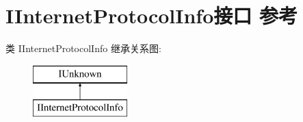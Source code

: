 \hypertarget{interface_i_internet_protocol_info}{}\section{I\+Internet\+Protocol\+Info接口 参考}
\label{interface_i_internet_protocol_info}
类 I\+Internet\+Protocol\+Info 继承关系图\+:\begin{figure}[H]
\begin{center}
\leavevmode
\includegraphics[height=2.000000cm]{interface_i_internet_protocol_info}
\end{center}
\end{figure}
